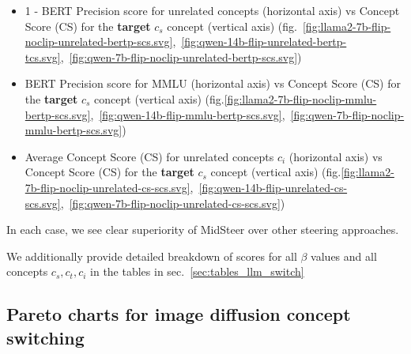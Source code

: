 \begin{itemize}
    \item 1 - BERT Precision score for unrelated concepts (horizontal axis) vs Concept Score (CS) for the \textbf{target} $c_s$ concept (vertical axis) (fig.~\ref{fig:llama2-7b-flip-noclip-unrelated-bertp-scs.svg},~\ref{fig:qwen-14b-flip-unrelated-bertp-tcs.svg},~\ref{fig:qwen-7b-flip-noclip-unrelated-bertp-scs.svg})
    \item BERT Precision score for MMLU (horizontal axis) vs Concept Score (CS) for the \textbf{target} $c_s$ concept (vertical axis) (fig.\ref{fig:llama2-7b-flip-noclip-mmlu-bertp-scs.svg},~\ref{fig:qwen-14b-flip-mmlu-bertp-scs.svg},~\ref{fig:qwen-7b-flip-noclip-mmlu-bertp-scs.svg})
    \item Average Concept Score (CS) for unrelated concepts $c_i$ (horizontal axis) vs Concept Score (CS) for the \textbf{target} $c_s$ concept (vertical axis) (fig.\ref{fig:llama2-7b-flip-noclip-unrelated-cs-scs.svg},~\ref{fig:qwen-14b-flip-unrelated-cs-scs.svg},~\ref{fig:qwen-7b-flip-noclip-unrelated-cs-scs.svg})
\end{itemize}

In each case, we see clear superiority of MidSteer over other steering approaches.

We additionally provide detailed breakdown of scores for all $\beta$ values and all concepts $c_s, c_t, c_i$ in the tables in sec.~\ref{sec:tables_llm_switch}



\clearpage
\subsection{Pareto charts for image diffusion concept switching}
\label{sec:pareto_diffusion_switch}

